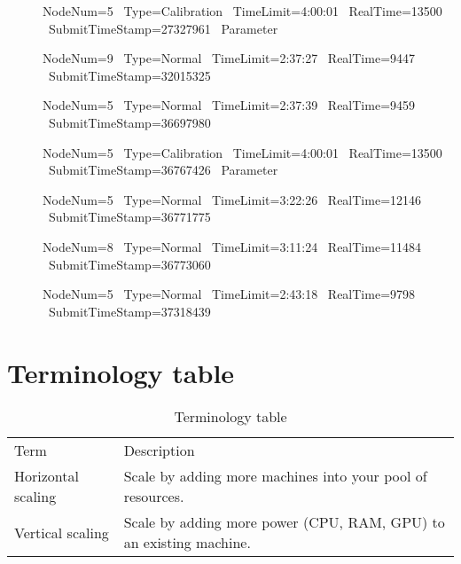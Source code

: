 \begin{description}
\item[] NodeNum=5 \ Type=Calibration \ TimeLimit=4:00:01 \ RealTime=13500 \ SubmitTimeStamp=27327961 \ Parameter
\item[] NodeNum=9 \ Type=Normal \ TimeLimit=2:37:27 \ RealTime=9447 \ SubmitTimeStamp=32015325
\item[] NodeNum=5 \ Type=Normal \ TimeLimit=2:37:39 \ RealTime=9459 \ SubmitTimeStamp=36697980
\item[] NodeNum=5 \ Type=Calibration \ TimeLimit=4:00:01 \ RealTime=13500 \ SubmitTimeStamp=36767426 \ Parameter
\item[] NodeNum=5 \ Type=Normal \ TimeLimit=3:22:26 \ RealTime=12146 \ SubmitTimeStamp=36771775
\item[] NodeNum=8 \ Type=Normal \ TimeLimit=3:11:24 \ RealTime=11484 \ SubmitTimeStamp=36773060
\item[] NodeNum=5 \ Type=Normal \ TimeLimit=2:43:18 \ RealTime=9798 \ SubmitTimeStamp=37318439
 
\end{description}

\section{Terminology table}
\begin{table}[]
    \centering
    \begin{tabular}{ll}
    Term               & Description                                                        \\
    Horizontal scaling & Scale by adding more machines into your pool of resources.         \\
    Vertical scaling   & Scale by adding more power (CPU, RAM, GPU) to an existing machine.
    \end{tabular}
    \caption{Terminology table}
    \label{tab:term}
\end{table}

